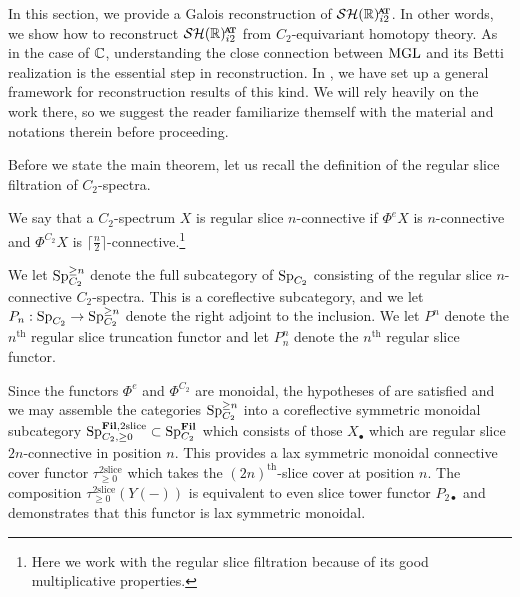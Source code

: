 In this section, we provide a Galois reconstruction of $\SHRat$. In other words, we show how to reconstruct $\SHRat$ from $C_2$-equivariant homotopy theory.
As in the case of $\mathbb{C}$, understanding the close connection between $\mathrm{MGL}$ and its Betti realization is the essential step in reconstruction.
In , we have set up a general framework for reconstruction results of this kind. We will rely heavily on the work there, so we suggest the reader familiarize themself with the material and notations therein before proceeding.

Before we state the main theorem, let us recall the definition of the regular slice filtration of $C_2$-spectra.

\begin{dfn}
  We say that a $C_2$-spectrum $X$ is regular slice $n$-connective if $\Phi^e X$ is $n$-connective and $\Phi^{C_2} X$ is $\lceil \frac{n}{2} \rceil$-connective.\footnote{Here we work with the regular slice filtration because of its good multiplicative properties.}

  We let $\operatorname{\mathrm{Sp}}_{C_2} ^{\geq n}$ denote the full subcategory of $\operatorname{\mathrm{Sp}}_{C_2}$ consisting of the regular slice $n$-connective $C_2$-spectra. This is a coreflective subcategory, and we let $P_{n} : \operatorname{\mathrm{Sp}}_{C_2} \to \operatorname{\mathrm{Sp}}_{C_2} ^{\geq n}$ denote the right adjoint to the inclusion. We let $P^n$ denote the $n^{\mathrm{th}}$ regular slice truncation functor and let $P^n _n$ denote the $n^{\mathrm{th}}$ regular slice functor.
\end{dfn}

\begin{cnstr}
  Since the functors $\Phi^e$ and $\Phi^{C_2}$ are monoidal, the hypotheses of  are satisfied and we may assemble the categories $\operatorname{\mathrm{Sp}}_{C_2}^{\geq n}$ into a coreflective symmetric monoidal subcategory $\operatorname{\mathrm{Sp}}_{C_2, \geq 0}^{\operatorname{\mathbf{Fil}}, 2\mathrm{slice}} \subset \operatorname{\mathrm{Sp}}_{C_2}^{\operatorname{\mathbf{Fil}}}$ which consists of those $X_\bullet$ which are regular slice $2n$-connective in position $n$. This provides a lax symmetric monoidal connective cover functor $\tau_{\geq 0}^{2\mathrm{slice}}$ which takes the $(2n)^{\mathrm{th}}$-slice cover at position $n$. The composition $\tau_{\geq 0}^{2\mathrm{slice}}(Y(-))$ is equivalent to even slice tower functor $P_{2\bullet}$ and demonstrates that this functor is lax symmetric monoidal.
\end{cnstr}


